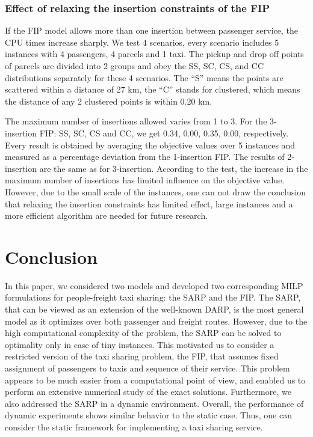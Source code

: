 \documentclass[preprint,authoryear,12pt]{elsarticle}
\begin{document}
\subsubsection{Effect of relaxing the insertion constraints of the FIP}
If the FIP model allows more than one insertion between passenger service, the CPU times increase sharply. We test 4 scenarios, every scenario includes 5 instances with 4 passengers, 4 parcels and 1 taxi. The pickup and drop off points of parcels are divided into 2 groups and obey the SS, SC, CS, and CC distributions separately for these 4 scenarios. The ``S'' means the points are scattered within a distance of 27 km, the ``C'' stands for clustered, which means the distance of any 2 clustered points is within 0.20 km. 

The maximum number of insertions allowed varies from 1 to 3. For the 3-insertion FIP: SS, SC, CS and CC, we get 0.34, 0.00, 0.35, 0.00, respectively. Every result is obtained by averaging the objective values over 5 instances and measured as a percentage deviation from the 1-insertion FIP. The results of 2-insertion are the same as for 3-insertion. According to the test, the increase in the maximum number of insertions has limited influence on the objective value. However, due to the small scale of the instances, one can not draw the conclusion that relaxing the insertion constraints has limited effect, large instances and a more efficient algorithm are needed for future research.

\section{Conclusion}\label{sec_conclusions}
In this paper, we considered two models and developed two corresponding MILP formulations for people-freight taxi sharing: the SARP and the FIP. The SARP, that can be viewed as an extension of the well-known DARP, is the most general model as it optimizes over both passenger and freight routes. However, due to the high computational complexity of the problem, the SARP can be solved to optimality only in case of tiny instances. This motivated us to consider a restricted version of the taxi sharing problem, the FIP, that assumes fixed assignment of passengers to taxis and sequence of their service. This problem appears to be much easier from a computational point of view, and enabled us to perform an extensive numerical study of the exact solutions. Furthermore, we also addressed  the SARP in a dynamic environment. Overall, the performance of dynamic experiments shows similar behavior to the static case. Thus, one can consider the static framework for implementing a taxi sharing service. 
\end{document}
